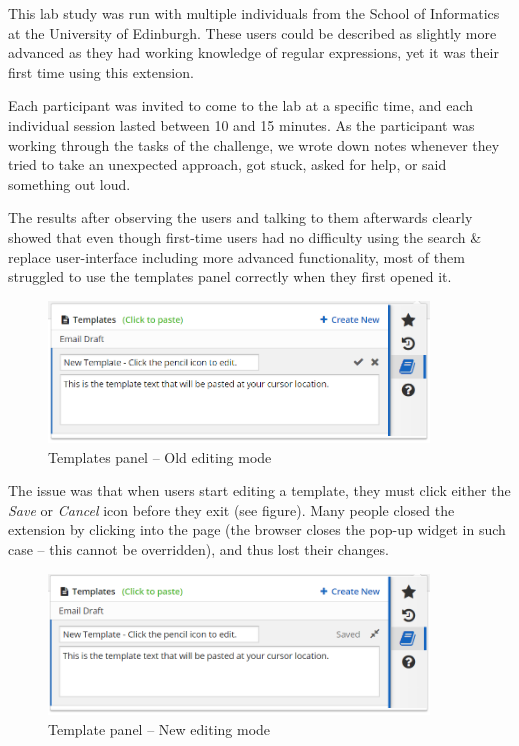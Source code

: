 \documentclass[bsc,frontabs,twoside,singlespacing,parskip,deptreport]{infthesis}
\begin{document}
This lab study was run with multiple individuals from the School of Informatics at the University of Edinburgh. These users could be described as slightly more advanced as they had working knowledge of regular expressions, yet it was their first time using this extension.

Each participant was invited to come to the lab at a specific time, and each individual session lasted between 10 and 15 minutes. As the participant was working through the tasks of the challenge, we wrote down notes whenever they tried to take an unexpected approach, got stuck, asked for help, or said something out loud.

The results after observing the users and talking to them afterwards clearly showed that even though first-time users had no difficulty using the search \& replace user-interface including more advanced functionality, most of them struggled to use the templates panel correctly when they first opened it. 

\begin{figure}[h]
\centering
\includegraphics[width=0.9\textwidth]{../docs/template-edit-mode-old.png}
\caption{Templates panel -- Old editing mode}
\end{figure}

The issue was that when users start editing a template, they must click either the \textit{Save} or \textit{Cancel} icon before they exit (see figure). Many people closed the extension by clicking into the page (the browser closes the pop-up widget in such case -- this cannot be overridden), and thus lost their changes.

\begin{figure}[h]
\centering
\includegraphics[width=0.9\textwidth]{../docs/template-edit-mode.png}
\caption{Template panel -- New editing mode}
\end{figure}
\end{document}
